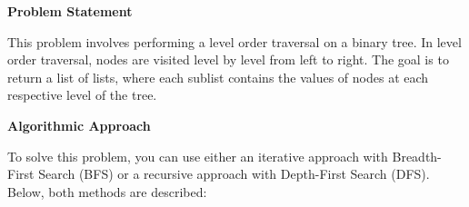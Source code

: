 

\textbf{Problem Statement}

This problem involves performing a level order traversal on a binary tree. In level order traversal, nodes are visited level by level from left to right. The goal is to return a list of lists, where each sublist contains the values of nodes at each respective level of the tree.

\textbf{Algorithmic Approach}

To solve this problem, you can use either an iterative approach with Breadth-First Search (BFS) or a recursive approach with Depth-First Search (DFS). Below, both methods are described:

